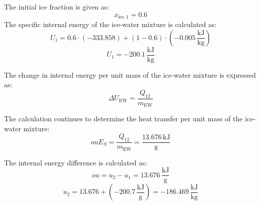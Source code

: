 The initial ice fraction is given as:  
\[
x_{\text{ice},1} = 0.6
\]  
The specific internal energy of the ice-water mixture is calculated as:  
\[
U_1 = 0.6 \cdot (-333.858) + (1 - 0.6) \cdot (-0.005 \, \frac{\text{kJ}}{\text{kg}})
\]  
\[
U_1 = -200.1 \, \frac{\text{kJ}}{\text{kg}}
\]  

The change in internal energy per unit mass of the ice-water mixture is expressed as:  
\[
\Delta U_{\text{EW}} = \frac{Q_{12}}{m_{\text{EW}}}
\]

The calculation continues to determine the heat transfer per unit mass of the ice-water mixture:  
\[
ouE_{S} = \frac{Q_{12}}{m_{\text{EW}}} = \frac{13.676 \, \text{kJ}}{\text{g}}
\]  

The internal energy difference is calculated as:  
\[
ou = u_2 - u_1 = 13.676 \, \frac{\text{kJ}}{\text{g}}
\]  
\[
u_2 = 13.676 + (-200.7 \, \frac{\text{kJ}}{\text{g}}) = -186.469 \, \frac{\text{kJ}}{\text{kg}}
\]